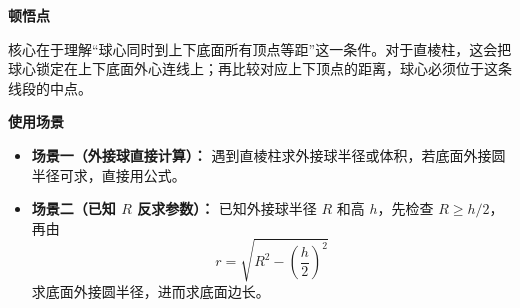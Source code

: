 \begin{explanationbox}
	\medskip
	\textbf{\textcolor{CExplanation}{顿悟点}}

	核心在于理解“球心同时到上下底面所有顶点等距”这一条件。对于直棱柱，这会把球心锁定在上下底面外心连线上；再比较对应上下顶点的距离，球心必须位于这条线段的中点。

	\medskip
	\textbf{\textcolor{CExplanation}{使用场景}}
	\begin{itemize}[leftmargin=*, itemsep=0.5em, topsep=0.4em]
		\item \textbf{场景一（外接球直接计算）：} 遇到直棱柱求外接球半径或体积，若底面外接圆半径可求，直接用公式。
		\item \textbf{场景二（已知 $R$ 反求参数）：} 已知外接球半径 $R$ 和高 $h$，先检查 $R\geq h/2$，再由
		      \[
			      r = \sqrt{R^{2}-\left(\frac{h}{2}\right)^{2}}
		      \]
		      求底面外接圆半径，进而求底面边长。
	\end{itemize}
\end{explanationbox}